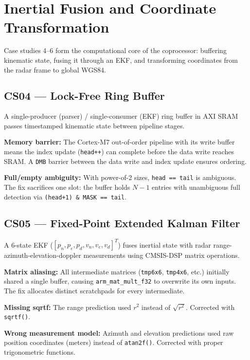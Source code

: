 \section{Inertial Fusion and Coordinate Transformation}
\label{sec:cs04-06}

Case studies 4--6 form the computational core of the coprocessor: buffering kinematic state, fusing it through an EKF, and transforming coordinates from the radar frame to global WGS84.

\subsection{CS04 --- Lock-Free Ring Buffer}

A single-producer (parser) / single-consumer (EKF) ring buffer in AXI SRAM passes timestamped kinematic state between pipeline stages.

\textbf{Memory barrier:} The Cortex-M7 out-of-order pipeline with its write buffer means the index update (\texttt{head++}) can complete before the data write reaches SRAM. A \texttt{DMB} barrier between the data write and index update ensures ordering.

\textbf{Full/empty ambiguity:} With power-of-2 sizes, \texttt{head == tail} is ambiguous. The fix sacrifices one slot: the buffer holds $N-1$ entries with unambiguous full detection via \texttt{(head+1) \& MASK == tail}.

\subsection{CS05 --- Fixed-Point Extended Kalman Filter}

A 6-state EKF ($[p_n, p_e, p_d, v_n, v_e, v_d]^T$) fuses inertial state with radar range-azimuth-elevation-doppler measurements using CMSIS-DSP matrix operations.

\textbf{Matrix aliasing:} All intermediate matrices (\texttt{tmp6x6}, \texttt{tmp4x6}, etc.) initially shared a single buffer, causing \texttt{arm\_mat\_mult\_f32} to overwrite its own inputs. The fix allocates distinct scratchpads for every intermediate.

\textbf{Missing sqrtf:} The range prediction used $r^2$ instead of $\sqrt{r^2}$. Corrected with \texttt{sqrtf()}.

\textbf{Wrong measurement model:} Azimuth and elevation predictions used raw position coordinates (meters) instead of \texttt{atan2f()}. Corrected with proper trigonometric functions.

